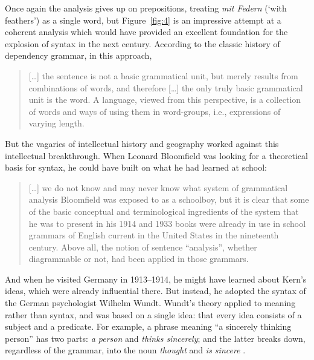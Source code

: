 \documentclass[output=paper
	        ,collection
	        ,collectionchapter
 	        ,biblatex
                ,babelshorthands
                ,newtxmath
                ,draftmode
                ,colorlinks, citecolor=brown
]{langscibook}
\begin{document}
Once again the analysis gives up on prepositions, treating \emph{mit Federn} (‘with feathers’) as a single word, but Figure~\ref{fig:4} is an impressive attempt at a coherent analysis which would have provided an excellent foundation for the explosion of syntax in the next century. According to the classic history of dependency grammar, in this approach,

\begin{quotation}
	[\dots] the sentence is not a basic grammatical unit, but merely results from combinations of words, and therefore [\dots] the only truly basic grammatical unit is the word. A language, viewed from this perspective, is a collection of words and ways of using them in word-groups, i.e., expressions of varying length. \citep[21]{Percival1976}
\end{quotation}

But the vagaries of intellectual history and geography worked against this intellectual breakthrough. When Leonard Bloomfield was looking for a theoretical basis for syntax, he could have built on what he had learned at school:

\begin{quotation}
	[\dots] we do not know and may never know what system of grammatical analysis Bloomfield was exposed to as a schoolboy, but it is clear that some of the basic conceptual and terminological ingredients of the system that he was to present in his 1914 and 1933 books were already in use in school grammars of English current in the United States in the nineteenth century. Above all, the notion of sentence ``analysis'', whether diagrammable or not, had been applied in those grammars. \citep[18]{Percival1976}
\end{quotation}

And when he visited Germany in 1913--1914, he might have learned about Kern’s ideas, which were already influential there. But instead, he adopted the syntax of the German psychologist Wilhelm Wundt. Wundt’s theory applied to meaning rather than syntax, and was based on a single idea: that every idea consists of a subject and a predicate. For example, a phrase meaning ``a sincerely thinking person'' has two parts: \emph{a person} and \emph{thinks sincerely}; and the latter breaks down, regardless of the grammar, into the noun \emph{thought} and \emph{is sincere} \citep{Percival1976}.
\end{document}
